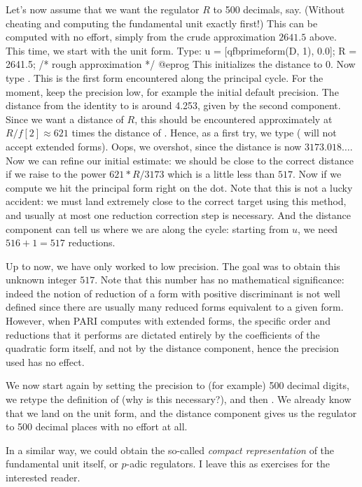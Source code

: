 Let's now assume that we want the regulator $R$ to 500 decimals, say.
(Without cheating and computing the fundamental unit exactly first!)
This can be computed with no effort, simply from the crude approximation
$2641.5$ above. This time, we start with the unit form. Type:
\bprog
  u = [qfbprimeform(D, 1), 0.0];
  R = 2641.5; /* rough approximation */
@eprog\noindent
This initializes the distance to $0$.
Now type  . This is the
first form encountered along the principal cycle. For the moment, keep the
precision low, for example the initial default precision. The distance from
the identity to  is around 4.253, given by the second component.
Since we want a distance of $R$, this should be encountered approximately at
$R/f[2] \approx 621$ times the distance of . Hence, as a first try, we
type  ( will not accept extended forms).
Oops, we overshot, since the distance is now $3173.018\dots$.
Now we can refine our initial estimate: we should be close to
the correct distance if we raise  to the power $621*R/3173$ which
is a little less than $517$. Now if we compute  we hit the
principal form right on the dot. Note that this is not a lucky accident: we
must land extremely close to the correct target using this method, and
usually at most one reduction correction step is necessary. And the distance
component can tell us where we are along the cycle: starting from $u$, we
need $516+1 = 517$ reductions.

Up to now, we have only worked to low precision. The goal was to obtain this
unknown integer $517$. Note that this number has no mathematical
significance: indeed the notion of reduction of a form with positive
discriminant is not well defined since there are usually many reduced forms
equivalent to a given form. However, when PARI computes with extended forms,
the specific order and reductions that it performs are dictated entirely by
the coefficients of the quadratic form itself, and not by the distance
component, hence the precision used has no effect.

We now start again by setting the precision to (for example) 500 decimal
digits, we retype the definition of  (why is this necessary?), and then
. We already know that we land on the
unit form, and the distance component gives us the regulator to 500 decimal
places with no effort at all.

In a similar way, we could obtain the so-called \emph{compact representation}
of the fundamental unit itself, or $p$-adic regulators. I leave this as
exercises for the interested reader.

